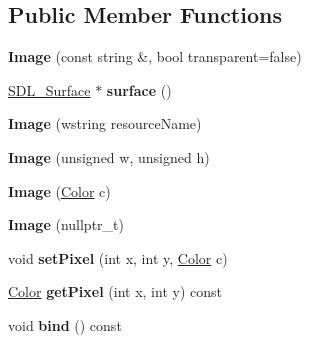 \subsection*{Public Member Functions}
\begin{DoxyCompactItemize}
\item 
\hypertarget{classImage_a5408754295f3c928f514504a1af7f0d6}{{\bfseries Image} (const string \&, bool transparent=false)}\label{classImage_a5408754295f3c928f514504a1af7f0d6}

\item 
\hypertarget{classImage_a18ae111e701a052087cc2ac6546f3c3f}{\hyperlink{structSDL__Surface}{S\+D\+L\+\_\+\+Surface} $\ast$ {\bfseries surface} ()}\label{classImage_a18ae111e701a052087cc2ac6546f3c3f}

\item 
\hypertarget{classImage_a54e0042d9eac7f20a1dab76683fe9c7f}{{\bfseries Image} (wstring resource\+Name)}\label{classImage_a54e0042d9eac7f20a1dab76683fe9c7f}

\item 
\hypertarget{classImage_a9b680c47c5cbcdb5e40cbafda9f01585}{{\bfseries Image} (unsigned w, unsigned h)}\label{classImage_a9b680c47c5cbcdb5e40cbafda9f01585}

\item 
\hypertarget{classImage_ae464aed23c1ff34ad69d6a523035c8f9}{{\bfseries Image} (\hyperlink{structColor}{Color} c)}\label{classImage_ae464aed23c1ff34ad69d6a523035c8f9}

\item 
\hypertarget{classImage_aeadd5d847590baf1a1dc8956476bb78e}{{\bfseries Image} (nullptr\+\_\+t)}\label{classImage_aeadd5d847590baf1a1dc8956476bb78e}

\item 
\hypertarget{classImage_a26e062a056015a1aebf4bbc9961646d5}{void {\bfseries set\+Pixel} (int x, int y, \hyperlink{structColor}{Color} c)}\label{classImage_a26e062a056015a1aebf4bbc9961646d5}

\item 
\hypertarget{classImage_a39c099122fc2bb6f0ed9ad4080681b1a}{\hyperlink{structColor}{Color} {\bfseries get\+Pixel} (int x, int y) const }\label{classImage_a39c099122fc2bb6f0ed9ad4080681b1a}

\item 
\hypertarget{classImage_aca8eb96b468eaeaf83df9141c0710a8b}{void {\bfseries bind} () const }\label{classImage_aca8eb96b468eaeaf83df9141c0710a8b}


\end{DoxyCompactItemize}
